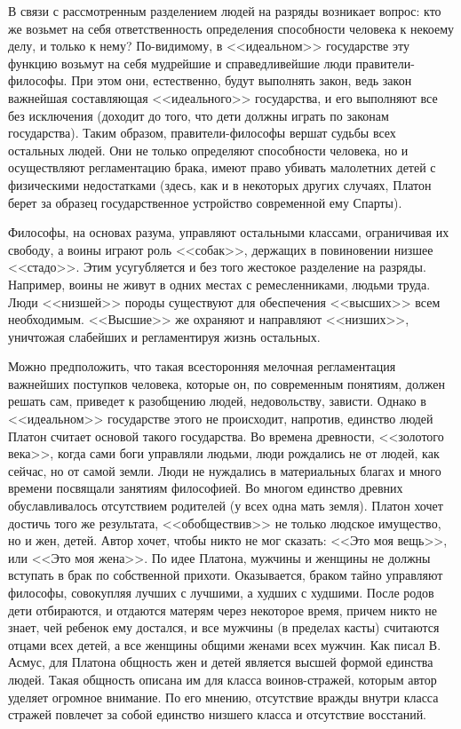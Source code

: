 	В связи с рассмотренным разделением людей на разряды возникает вопрос: 
	кто же возьмет на себя ответственность определения способности человека к 
	некоему делу, и только к нему? По-видимому, в <<идеальном>> государстве эту 
	функцию возьмут на себя мудрейшие и справедливейшие люди 
	правители-философы. При этом они, естественно, будут выполнять закон, 
	ведь закон важнейшая составляющая <<идеального>> государства, и его выполняют 
	все без исключения (доходит до того, что дети должны играть по законам 
	государства). Таким образом, правители-философы вершат судьбы всех 
	остальных людей. Они не только определяют способности человека, но и 
	осуществляют регламентацию брака, имеют право убивать малолетних детей 
	с физическими недостатками (здесь, как и в некоторых других случаях, 
	Платон берет за образец государственное устройство современной ему Спарты). 

	Философы, на основах разума, управляют остальными классами, ограничивая их 
	свободу, а воины играют роль <<собак>>, держащих в повиновении низшее <<стадо>>. 
	Этим усугубляется и без того жестокое разделение на разряды. Например, воины 
	не живут в одних местах с ремесленниками, людьми труда. Люди <<низшей>> породы 
	существуют для обеспечения <<высших>> всем необходимым. <<Высшие>> же охраняют и 
	направляют <<низших>>, уничтожая слабейших и регламентируя жизнь остальных. 

	Можно предположить, что такая всесторонняя мелочная регламентация важнейших 
	поступков человека, которые он, по современным понятиям, должен решать сам, 
	приведет к разобщению людей, недовольству, зависти. Однако в <<идеальном>> 
	государстве этого не происходит, напротив, единство людей Платон считает 
	основой такого государства. Во времена древности, <<золотого века>>, когда 
	сами боги управляли людьми, люди рождались не от людей, как сейчас, но от 
	самой земли. Люди не нуждались в материальных благах и много времени 
	посвящали занятиям философией. Во многом единство древних обуславливалось 
	отсутствием родителей (у всех одна мать земля). Платон хочет достичь того 
	же результата, <<обобществив>> не только людское имущество, но и жен, детей. 
	Автор хочет, чтобы никто не мог сказать: <<Это моя вещь>>, или 
	<<Это моя жена>>. По идее Платона, мужчины и женщины не должны вступать в 
	брак по собственной прихоти. Оказывается, браком тайно управляют философы, 
	совокупляя лучших с лучшими, а худших с худшими. После родов дети 
	отбираются, и отдаются матерям через некоторое время, причем никто 
	не знает, чей ребенок ему достался, и все мужчины (в пределах касты) 
	считаются отцами всех детей, а все женщины общими женами всех мужчин. 
	Как писал В. Асмус, для Платона общность жен и детей является высшей 
	формой единства людей. Такая общность описана им для класса 
	воинов-стражей, которым автор уделяет огромное внимание. По его мнению, 
	отсутствие вражды внутри класса стражей повлечет за собой единство низшего 
	класса и отсутствие восстаний. 

